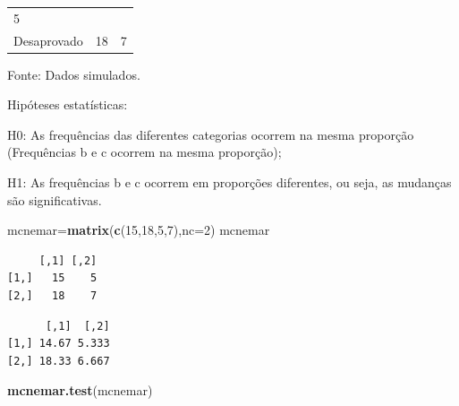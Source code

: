 \documentclass[12pt,brazil,oneside]{book}
\newenvironment{Shaded}{\begin{snugshade}}{\end{snugshade}}
\newcommand{\DataTypeTok}[1]{\textcolor[rgb]{0.13,0.29,0.53}{#1}}
\newcommand{\DecValTok}[1]{\textcolor[rgb]{0.00,0.00,0.81}{#1}}
\newcommand{\KeywordTok}[1]{\textcolor[rgb]{0.13,0.29,0.53}{\textbf{#1}}}
\newcommand{\NormalTok}[1]{#1}
\newcommand{\OperatorTok}[1]{\textcolor[rgb]{0.81,0.36,0.00}{\textbf{#1}}}
\begin{document}
\begin{longtable}[]{@{}lll@{}}
\begin{minipage}[t]{0.22\columnwidth}
5\strut
\end{minipage}\tabularnewline
\begin{minipage}[t]{0.35\columnwidth}\raggedright
Desaprovado\strut
\end{minipage} & \begin{minipage}[t]{0.25\columnwidth}\raggedright
18\strut
\end{minipage} & \begin{minipage}[t]{0.22\columnwidth}\raggedright
7\strut
\end{minipage}\tabularnewline
\bottomrule
\end{longtable}

Fonte: Dados simulados.

Hipóteses estatísticas:

H0: As frequências das diferentes categorias ocorrem na mesma proporção
(Frequências b e c ocorrem na mesma proporção);

H1: As frequências b e c ocorrem em proporções diferentes, ou seja, as
mudanças são significativas.

\begin{Shaded}
\begin{Highlighting}[]
\NormalTok{mcnemar=}\KeywordTok{matrix}\NormalTok{(}\KeywordTok{c}\NormalTok{(}\DecValTok{15}\NormalTok{,}\DecValTok{18}\NormalTok{,}\DecValTok{5}\NormalTok{,}\DecValTok{7}\NormalTok{),}\DataTypeTok{nc=}\DecValTok{2}\NormalTok{)}
\NormalTok{mcnemar}
\end{Highlighting}
\end{Shaded}

\begin{verbatim}
     [,1] [,2]
[1,]   15    5
[2,]   18    7
\end{verbatim}

\begin{Shaded}
\end{Shaded}

\begin{verbatim}
      [,1]  [,2]
[1,] 14.67 5.333
[2,] 18.33 6.667
\end{verbatim}

\begin{Shaded}
\begin{Highlighting}[]
\KeywordTok{mcnemar.test}\NormalTok{(mcnemar)}
\end{Highlighting}
\end{Shaded}
\end{document}
